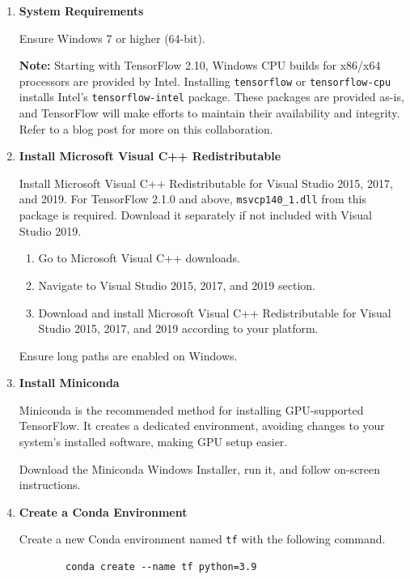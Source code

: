 \begin{enumerate}
	\item \textbf{System Requirements}
	
	Ensure Windows 7 or higher (64-bit).
	
	\textbf{Note:} Starting with TensorFlow 2.10, Windows CPU builds for x86/x64 processors are provided by Intel. Installing \texttt{tensorflow} or \texttt{tensorflow-cpu} installs Intel's \texttt{tensorflow-intel} package. These packages are provided as-is, and TensorFlow will make efforts to maintain their availability and integrity. Refer to a blog post for more on this collaboration.
	
	\item \textbf{Install Microsoft Visual C++ Redistributable}
	
	Install Microsoft Visual C++ Redistributable for Visual Studio 2015, 2017, and 2019. For TensorFlow 2.1.0 and above, \texttt{msvcp140\_1.dll} from this package is required. Download it separately if not included with Visual Studio 2019.
	
	\begin{enumerate}
		\item Go to Microsoft Visual C++ downloads.
		\item Navigate to Visual Studio 2015, 2017, and 2019 section.
		\item Download and install Microsoft Visual C++ Redistributable for Visual Studio 2015, 2017, and 2019 according to your platform.
	\end{enumerate}
	
	Ensure long paths are enabled on Windows.
	
	\item \textbf{Install Miniconda}
	
	Miniconda is the recommended method for installing GPU-supported TensorFlow. It creates a dedicated environment, avoiding changes to your system's installed software, making GPU setup easier.
	
	Download the Miniconda Windows Installer, run it, and follow on-screen instructions.
	
	\item \textbf{Create a Conda Environment}
	
	Create a new Conda environment named \texttt{tf} with the following command.
	
	\begin{verbatim}
		conda create --name tf python=3.9
	\end{verbatim}
	

\end{enumerate}
